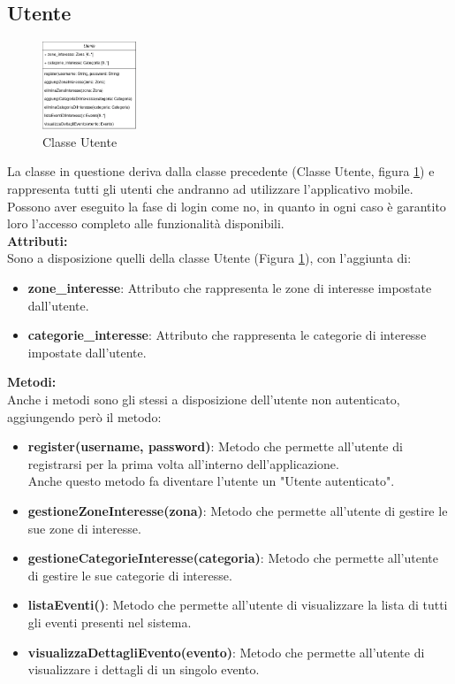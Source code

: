 \documentclass{article}
\begin{document}
\clearpage

\subsection{Utente}

\begin{figure}[htbp]
	\centering
	\includegraphics[width=0.25\textwidth]{Images/Utente-Class.png}
	\caption{Classe Utente}
	\label{fig:utente}
\end{figure}

La classe in questione deriva dalla classe precedente (Classe Utente, figura \ref{fig:utente}) e rappresenta tutti gli utenti che andranno ad utilizzare l'applicativo mobile.\\
Possono aver eseguito la fase di login come no, in quanto in ogni caso è garantito loro l'accesso completo alle funzionalità disponibili.\\

\textbf{Attributi:}\\
Sono a disposizione quelli della classe Utente (Figura \ref{fig:utente}), con l'aggiunta di:
\begin{itemize}
	\item \textbf{zone\_interesse}: Attributo che rappresenta le zone di interesse impostate dall'utente.
	\item \textbf{categorie\_interesse}: Attributo che rappresenta le categorie di interesse impostate dall'utente.\\
\end{itemize}

\textbf{Metodi:}\\
Anche i metodi sono gli stessi a disposizione dell'utente non autenticato, aggiungendo però il metodo:
\begin{itemize}
	\item \textbf{register(username, password)}: Metodo che permette all'utente di registrarsi per la prima volta all'interno dell'applicazione.\\ Anche questo metodo fa diventare l'utente un "Utente autenticato".
	\item \textbf{gestioneZoneInteresse(zona)}: Metodo che permette all'utente di gestire le sue zone di interesse.
	\item \textbf{gestioneCategorieInteresse(categoria)}: Metodo che permette all'utente di gestire le sue categorie di interesse.
	\item \textbf{listaEventi()}: Metodo che permette all'utente di visualizzare la lista di tutti gli eventi presenti nel sistema.
	\item \textbf{visualizzaDettagliEvento(evento)}: Metodo che permette all'utente di visualizzare i dettagli di un singolo evento.
\end{itemize}
\end{document}
